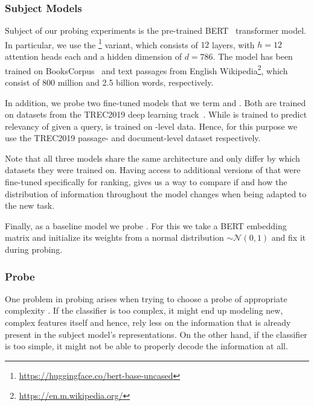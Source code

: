 \subsubsection{Subject Models}
\label{sec:subjects}
Subject of our probing experiments is the pre-trained BERT~\cite{devlin-etal-2019-bert} transformer model. In particular, we use the \footnote{\url{https://huggingface.co/bert-base-uncased}} variant, which consists of $12$ layers, with $h=12$ attention heads each and a hidden dimension of $d=786$. The model has been trained on BooksCorpus~\cite{7410368} and text passages from English Wikipedia\footnote{\url{https://en.m.wikipedia.org/}}, which consist of 800 million and 2.5 billion words, respectively.

In addition, we probe two fine-tuned  models that we term  and . Both are trained on datasets from the TREC2019 deep learning track~\cite{DBLP:journals/corr/abs-2003-07820}. While  is trained to predict relevancy of  given a query,  is trained on -level data. Hence, for this purpose we use the TREC2019 passage- and document-level dataset respectively.

Note that all three models share the same architecture and only differ by which datasets they were trained on. Having access to additional versions of  that were fine-tuned specifically for ranking, gives us a way to compare if and how the distribution of information throughout the model changes when being adapted to the new task.

Finally, as a baseline model we probe . For this we take a BERT embedding matrix and initialize its weights from a normal distribution $\sim \mathcal{N}(0, 1)$ and fix it during probing.

\subsubsection{Probe}
\label{sec:probe}
One problem in probing arises when trying to choose a probe of appropriate complexity \cite{hewitt-liang-2019-designing}. If the classifier is too complex, it might end up modeling new, complex features itself and hence, rely less on the information that is already present in the subject model's representations. On the other hand, if the classifier is too simple, it might not be able to properly decode the information at all.

